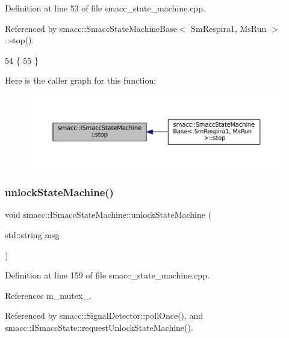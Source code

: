 Definition at line 53 of file smacc\+\_\+state\+\_\+machine.\+cpp.



Referenced by smacc\+::\+Smacc\+State\+Machine\+Base$<$ Sm\+Respira1, Ms\+Run $>$\+::stop().


\begin{DoxyCode}
54 \{
55 \}
\end{DoxyCode}
Here is the caller graph for this function\+:
\nopagebreak
\begin{figure}[H]
\begin{center}
\leavevmode
\includegraphics[width=350pt]{classsmacc_1_1ISmaccStateMachine_adcb1b55e014f982a713a863ffb0261d3_icgraph}
\end{center}
\end{figure}
\mbox{\label{classsmacc_1_1ISmaccStateMachine_ae2e3ceb87bfe3f9d8bf320e36071fdc7}} 
\subsubsection{\texorpdfstring{unlock\+State\+Machine()}{unlockStateMachine()}}
{\footnotesize\ttfamily void smacc\+::\+I\+Smacc\+State\+Machine\+::unlock\+State\+Machine (\begin{DoxyParamCaption}\item[{std\+::string}]{msg }\end{DoxyParamCaption})\hspace{0.3cm}{\ttfamily [private]}}



Definition at line 159 of file smacc\+\_\+state\+\_\+machine.\+cpp.



References m\+\_\+mutex\+\_\+.



Referenced by smacc\+::\+Signal\+Detector\+::poll\+Once(), and smacc\+::\+I\+Smacc\+State\+::request\+Unlock\+State\+Machine().


